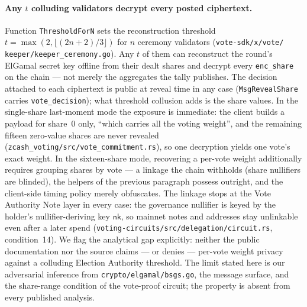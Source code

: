\documentclass[11pt,a4paper]{article}
\theoremstyle{definition}
\newcommand{\nksym}{\ensuremath{\mathsf{nk}}}
\begin{document}
\paragraph{Any $t$ colluding validators decrypt every posted ciphertext.}
Function \texttt{ThresholdForN} sets the reconstruction threshold
$t = \max(2, \lfloor (2n+2)/3 \rfloor)$ for $n$ ceremony validators
(\texttt{vote-sdk/\allowbreak x/\allowbreak vote/\allowbreak
keeper/\allowbreak keeper\_\allowbreak ceremony.go}). Any $t$ of them
can
reconstruct the round's ElGamal secret key offline from their dealt shares
and decrypt every \texttt{enc\_share} on the chain --- not merely the
aggregates the tally publishes. The decision attached to each ciphertext
is public at reveal time in any case (\texttt{MsgRevealShare} carries
\texttt{vote\_decision}); what threshold collusion adds is the share
values. In the single-share last-moment mode the exposure is immediate:
the client builds a payload for share~0 only, ``which carries all the
voting weight'', and the remaining fifteen zero-value shares are never
revealed (\texttt{zcash\_voting/src/vote\_commitment.rs}), so one
decryption yields one vote's exact weight. In the sixteen-share mode,
recovering a per-vote weight additionally requires grouping shares by
vote --- a linkage the chain withholds (share nullifiers are blinded), the
helpers of the previous paragraph possess outright, and the client-side
timing policy merely obfuscates. The linkage stops at the Vote Authority
Note layer in every case: the governance nullifier is keyed by the
holder's nullifier-deriving key \nksym{}, so mainnet notes and addresses
stay unlinkable even after a later spend
(\texttt{voting-circuits/src/delegation/circuit.rs}, condition~14). We
flag the analytical gap explicitly: neither the public documentation nor
the source claims --- or denies --- per-vote weight privacy against a
colluding Election Authority threshold. The limit stated here is our
adversarial inference from \texttt{crypto/elgamal/bsgs.go}, the message
surface, and the share-range condition of the vote-proof circuit; the
property is absent from every published analysis.
\end{document}
